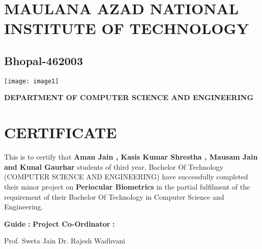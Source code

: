 \documentclass{article} %
\begin{document}
 

\noindent  

\noindent  

\noindent  

\noindent  

\noindent  

\noindent  

\noindent 
\section{MAULANA AZAD NATIONAL INSTITUTE OF TECHNOLOGY }

\noindent 
\subsection{         Bhopal-462003 }

\noindent  

\noindent \texttt{[image: image1]}

\noindent  

\noindent \textbf{DEPARTMENT OF COMPUTER SCIENCE AND ENGINEERING }

\noindent \textbf{ }

\noindent 
\section{CERTIFICATE }

\noindent \textbf{ }

\noindent This is to certify that \textbf{Aman Jain , Kasis Kumar Shrestha , Mausam Jain and Kunal Gaurhar} students of third year, Bachelor Of Technology (COMPUTER SCIENCE AND ENGINEERING) have successfully completed their minor project on \textbf{Periocular Biometrics} in the partial fulfilment of the requirement of their Bachelor Of Technology in Computer Science and Engineering. 

\noindent  

\noindent  

\noindent \textbf{Guide} \textbf{:}                \textbf{Project Co-Ordinator} \textbf{:} 

\noindent  

\noindent Prof. Sweta Jain            Dr. Rajesh Wadhvani 

\noindent \textbf{ }

\noindent \textbf{ }

\noindent \textbf{ }

\noindent 
\end{document}
